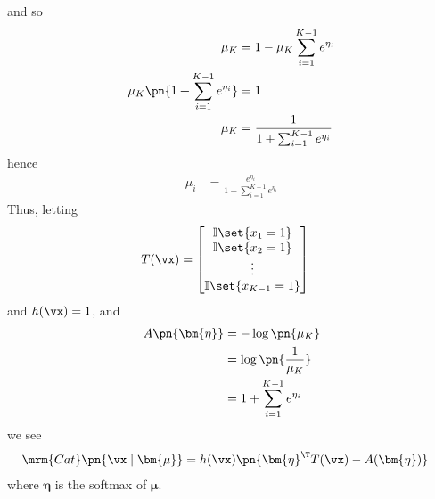 \documentclass[189]{pset}
\begin{document}
    and so
    \begin{align*}
      \mu_K
      &= 1 - \mu_K \sum_{i=1}^{K-1} e^{\eta_i} \\
      \mu_K \pn{1 + \sum_{i=1}^{K-1}e^{\eta_i}}
      &= 1 \\
      \mu_K
      &= \frac{1}{1 + \sum_{i=1}^{K-1}e^{\eta_i}}
    \end{align*}
    hence
    \begin{align*}
      \mu_i
      &= \frac{e^{\eta_i}}{1 + \sum_{i=1}^{K-1} e^{\eta_i}}
    \end{align*}
    Thus, letting
    \begin{align*}
      T(\vx)
      &=
        \begin{bmatrix}
          \mathbb{I}\set{x_1 = 1} \\
          \mathbb{I}\set{x_2 = 1} \\
          \vdots \\
          \mathbb{I}\set{x_{K-1} = 1}
        \end{bmatrix}
    \end{align*}
    and $h(\vx) = 1$, and
    \begin{align*}
      A\pn{\bm{\eta}}
      &= -\log\pn{\mu_K} \\
      &= \log\pn{\frac{1}{\mu_K}} \\
      &= 1 + \sum_{i=1}^{K-1}e^{\eta_i}
    \end{align*}
    we see
    \begin{align*}
      \mrm{Cat}\pn{\vx \mid \bm{\mu}}
      &= h(\vx) \pn{\bm{\eta}^\T T(\vx) - A(\bm{\eta})}
    \end{align*}
    where $\bm{\eta}$ is the softmax of $\bm{\mu}$.
\end{document}
